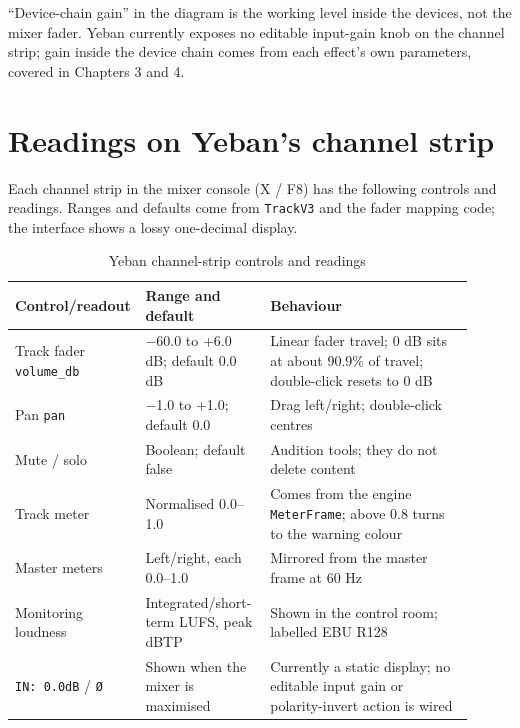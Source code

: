 ``Device-chain gain'' in the diagram is the working level inside the devices,
not the mixer fader. Yeban currently exposes no editable input-gain knob on the
channel strip; gain inside the device chain comes from each effect's own
parameters, covered in Chapters 3 and 4.

\section{Readings on Yeban's channel strip}

Each channel strip in the mixer console (X / F8) has the following controls and
readings. Ranges and defaults come from \texttt{TrackV3} and the fader mapping
code; the interface shows a lossy one-decimal display.

\begin{table}[htbp]
\centering
\small
\begin{tabular}{@{}p{0.20\linewidth}p{0.27\linewidth}p{0.44\linewidth}@{}}
\hline
Control/readout & Range and default & Behaviour \\
\hline
Track fader \texttt{volume\_db} & −60.0 to +6.0 dB; default 0.0 dB & Linear fader travel; 0 dB sits at about 90.9\% of travel; double-click resets to 0 dB \\
Pan \texttt{pan} & −1.0 to +1.0; default 0.0 & Drag left/right; double-click centres \\
Mute / solo & Boolean; default false & Audition tools; they do not delete content \\
Track meter & Normalised 0.0–1.0 & Comes from the engine \texttt{MeterFrame}; above 0.8 turns to the warning colour \\
Master meters & Left/right, each 0.0–1.0 & Mirrored from the master frame at 60 Hz \\
Monitoring loudness & Integrated/short-term LUFS, peak dBTP & Shown in the control room; labelled EBU R128 \\
\texttt{IN: 0.0dB} / \texttt{Ø} & Shown when the mixer is maximised & Currently a static display; no editable input gain or polarity-invert action is wired \\
\hline
\end{tabular}
\caption{Yeban channel-strip controls and readings}
\label{tab:channel-strip-readings}
\end{table}


